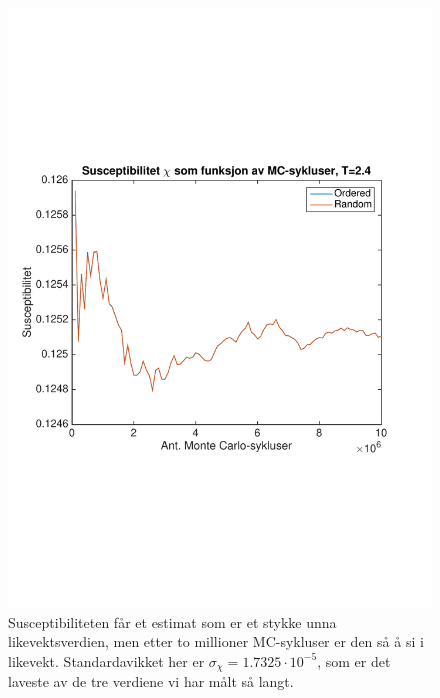 \documentclass[norsk, 10pt]{article}
\begin{document}
\begin{figure}[H]
\centering
\includegraphics[scale = 0.6, trim = 1cm 8cm 1cm 8cm]{b_chi_MC_L2_T24.pdf}
\caption{Susceptibiliteten får et estimat som er et stykke unna likevektsverdien, men etter to millioner MC-sykluser er den så å si i likevekt. Standardavikket her er $\sigma_\chi = 1.7325\cdot10^{-5}$, som er det laveste av de tre verdiene vi har målt så langt.}
\label{fig:chiT24}
\end{figure}
\end{document}
